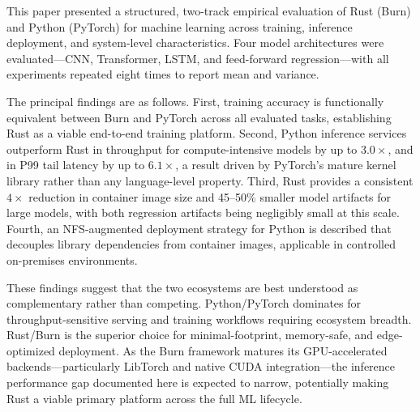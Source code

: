 \documentclass{ieeeaccess}
\begin{document}
This paper presented a structured, two-track empirical evaluation of Rust (Burn) and Python (PyTorch) for machine learning across training, inference deployment, and system-level characteristics. Four model architectures were evaluated---CNN, Transformer, LSTM, and feed-forward regression---with all experiments repeated eight times to report mean and variance.

The principal findings are as follows. First, training accuracy is functionally equivalent between Burn and PyTorch across all evaluated tasks, establishing Rust as a viable end-to-end training platform. Second, Python inference services outperform Rust in throughput for compute-intensive models by up to $3.0{\times}$, and in P99 tail latency by up to $6.1{\times}$, a result driven by PyTorch's mature kernel library rather than any language-level property. Third, Rust provides a consistent $4{\times}$ reduction in container image size and 45--50\% smaller model artifacts for large models, with both regression artifacts being negligibly small at this scale. Fourth, an NFS-augmented deployment strategy for Python is described that decouples library dependencies from container images, applicable in controlled on-premises environments.

These findings suggest that the two ecosystems are best understood as complementary rather than competing. Python/PyTorch dominates for throughput-sensitive serving and training workflows requiring ecosystem breadth. Rust/Burn is the superior choice for minimal-footprint, memory-safe, and edge-optimized deployment. As the Burn framework matures its GPU-accelerated backends---particularly LibTorch and native CUDA integration---the inference performance gap documented here is expected to narrow, potentially making Rust a viable primary platform across the full ML lifecycle.
\end{document}
